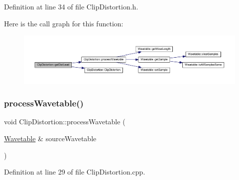 Definition at line 34 of file Clip\+Distortion.\+h.

Here is the call graph for this function\+:
\nopagebreak
\begin{figure}[H]
\begin{center}
\leavevmode
\includegraphics[width=350pt]{class_clip_distortion_a2a2656f1baaaa42f9c240040ecee9c68_cgraph}
\end{center}
\end{figure}
\mbox{\label{class_clip_distortion_a761af22fbd15eb8bcc9ac0fdfe4d655d}} 
\subsubsection{\texorpdfstring{process\+Wavetable()}{processWavetable()}}
{\footnotesize\ttfamily void Clip\+Distortion\+::process\+Wavetable (\begin{DoxyParamCaption}\item[{\hyperlink{class_wavetable}{Wavetable} \&}]{source\+Wavetable }\end{DoxyParamCaption})}



Definition at line 29 of file Clip\+Distortion.\+cpp.

